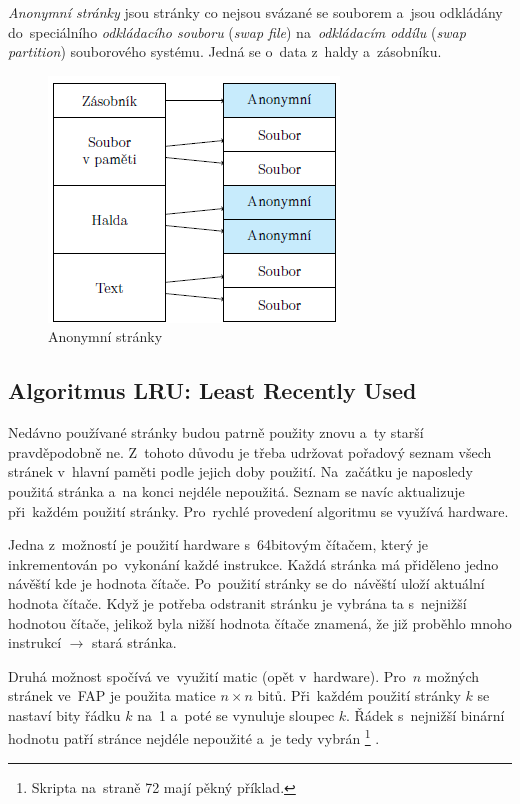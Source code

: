 \emph{Anonymní stránky} jsou stránky co nejsou svázané se souborem a~jsou odkládány do~speciálního \emph{odkládacího souboru} (\emph{swap file}) na~\emph{odkládacím oddílu} (\emph{swap partition}) souborového systému. Jedná se o~data z~haldy a~zásobníku.

\begin{figure}[ht]
	\centering
	\includegraphics[scale=1]{images/mem_page_anon.png}
	\caption{Anonymní stránky}
	\label{mem_page}
\end{figure}

\subsection{Algoritmus LRU: Least Recently Used}

Nedávno používané stránky budou patrně použity znovu a~ty starší pravděpodobně ne. Z~tohoto důvodu je třeba udržovat pořadový seznam všech stránek v~hlavní paměti podle jejich doby použití. Na~začátku je naposledy použitá stránka a~na konci nejdéle nepoužitá. Seznam se navíc aktualizuje při~každém použití stránky. Pro~rychlé provedení algoritmu se využívá hardware.

Jedna z~možností je použití hardware s~64bitovým čítačem, který je inkrementován po~vykonání každé instrukce. Každá stránka má přiděleno jedno návěští kde je hodnota čítače. Po~použití stránky se do~návěští uloží aktuální hodnota čítače. Když je potřeba odstranit stránku je vybrána ta s~nejnižší hodnotou čítače, jelikož byla nižší hodnota čítače znamená, že již proběhlo mnoho instrukcí $\rightarrow$ stará stránka.

\clearpage

Druhá možnost spočívá ve~využití matic (opět v~hardware). Pro~$n$ možných stránek ve~FAP je použita matice $n \times n$ bitů. Při~každém použití stránky $k$ se nastaví bity řádku $k$ na~1 a~poté se vynuluje sloupec $k$. Řádek s~nejnižší binární hodnotu patří stránce nejdéle nepoužité a~je tedy vybrán%
\footnote{Skripta na~straně 72 mají pěkný příklad.}%
.

